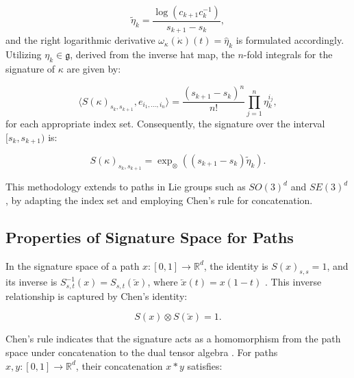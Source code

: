 \begin{equation}
\tilde{\eta}_k = \frac{\log(c_{k+1}c_k^{-1})}{s_{k+1} - s_k},
\end{equation}
and the right logarithmic derivative \( \omega_\kappa (\dot \kappa)(t) = \hat{\eta}_k \) is formulated accordingly. Utilizing \( \eta_k \in \mathfrak{g} \), derived from the inverse hat map, the \( n \)-fold integrals for the signature of \( \kappa \) are given by:

\begin{equation}
\langle S(\kappa)_{s_k,s_{k+1}}, e_{i_1,\ldots,i_n} \rangle = \frac{(s_{k+1} - s_k)^n}{n!} \prod_{j=1}^n \eta_{k}^{i_j},
\end{equation}
for each appropriate index set. Consequently, the signature over the interval \( [s_k, s_{k+1}) \) is:

\begin{equation}
S(\kappa)_{s_k,s_{k+1}} = \exp_{\otimes}\left( (s_{k+1} - s_k) \tilde{\eta}_k \right).
\label{eq:signature_lie_group}
\end{equation}

This methodology extends to paths in Lie groups such as \( SO(3)^d \) and \( SE(3)^d \), by adapting the index set and employing Chen’s rule for concatenation.


\subsection{Properties of Signature Space for Paths}
\label{subsec:signature-properties}

In the signature space of a path \(x : [0,1] \to \mathbb{R}^d\), the identity is \(S(x)_{s,s} = 1\), and its inverse is \(S_{s,t}^{-1}(x) = S_{s,t}(\overleftarrow{x})\), where \(\overleftarrow{x}(t) = x(1 - t)\) \cite{chevyrevPrimerSignatureMethod2016}. This inverse relationship is captured by Chen's identity:

\begin{equation}
S(x) \otimes S(\overleftarrow{x}) = 1.
\label{eq:chens-identity}
\end{equation}

Chen's rule indicates that the signature acts as a homomorphism from the path space under concatenation to the dual tensor algebra \cite{chenIntegrationPathsFaithful1958}. For paths \(x, y : [0,1] \rightarrow \mathbb{R}^d\), their concatenation \(x*y\) satisfies:

